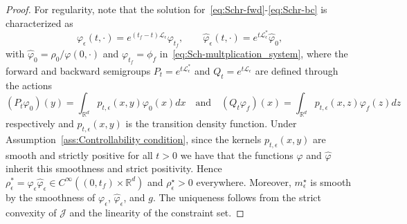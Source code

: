 \documentclass[10pt,a4paper]{amsart}
\newcommand{\R}{\mathbb{R}}
\begin{document}
\begin{proof}
For regularity, note that the solution for~\eqref{eq:Schr-fwd}-\eqref{eq:Schr-bc} is characterized as
\[
\varphi_\epsilon(t,\cdot) = e^{(t_f-t)\mathcal{L}_\epsilon}\varphi_{t_f}, \qquad 
\hat{\varphi}_\epsilon(t,\cdot) = e^{t\mathcal{L}_\epsilon^*}\hat{\varphi}_0,
\]
with $\hat{\varphi}_0 = \rho_0 / \varphi(0,\cdot)$ and $\varphi_{t_f}=\phi_f$ in~\eqref{eq:Sch-multplication_system},  where the forward and backward semigroups $P_t = e^{t\mathcal{L}_\epsilon^*}$ and $
Q_t = e^{t\mathcal{L}_\epsilon}$ are defined through the actions
\begin{equation}\label{eq: action_semigroup}
(P_t \varphi_0)(y) = \int_{\R^d} p_{t,\epsilon}(x,y) \varphi_0(x)   dx\quad\text{and}\quad (Q_t \varphi_f)(x) = \int_{\R^d} p_{t,\epsilon}(x,z) \varphi_f(z)   dz    
\end{equation}
respectively and $p_{t,\epsilon}(x,y)$ is the transition density function. Under Assumption~\ref{ass:Controllability condition}, since the kernels $p_{t,\epsilon}(x,y)$ are smooth and strictly positive for all $t>0$ we have that the functions $\varphi$ and $\hat{\varphi}$  inherit this smoothness and strict positivity. Hence $\rho_\epsilon^* = \varphi_\epsilon\hat{\varphi}_\epsilon \in C^\infty((0,t_f)\times\R^d)$ and $\rho_{\epsilon}^\star > 0$ everywhere. Moreover, $m_{\epsilon}^\star$ is smooth by the smoothness of $\varphi_\epsilon$, $\hat{\varphi}_\epsilon$, and $g$. The uniqueness follows from the strict convexity of $\mathcal{J}$ and the linearity of the constraint set.
\end{proof}
\end{document}
